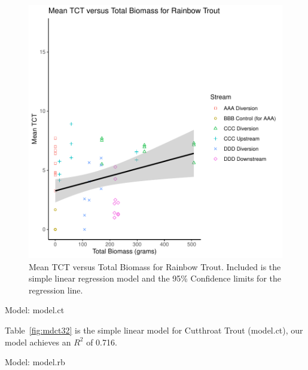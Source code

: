 \begin{figure}[H]
\includegraphics{AppendixImages/model_RB.pdf}
\caption{  \hspace{1mm} Mean TCT versus Total Biomass for Rainbow Trout. Included is the simple linear regression model and the 95\% Confidence limits for the regression line.}
\label{fig:rbanalysis}
\end{figure}






\begin{table}
 \begin{singlespace*}

\caption{\hspace{1mm}Model: model.ct}
\label{fig:mdct32}
\end{singlespace*}

\end{table}

Table~\ref{fig:mdct32} is the simple linear model for Cutthroat Trout (model.ct), our model achieves an $R^{2}$ of 0.716.



\begin{table}[H]
 \begin{singlespace*}

\caption{\hspace{1mm}Model: model.rb}
\label{fig:mdrb22}
\end{singlespace*}
\end{table}


